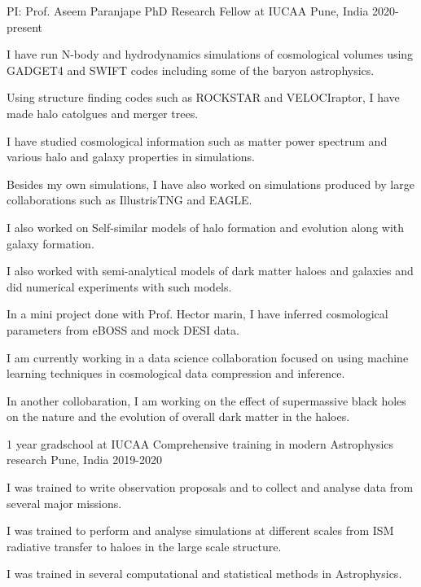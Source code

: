 \begin{cventries}

{
\cventry
{PI: Prof. Aseem Paranjape} %
{PhD Research Fellow at IUCAA} %
{Pune, India} %
{2020-present} %
{ %
\begin{cvitems}
\item {I have run N-body and hydrodynamics simulations of cosmological volumes using GADGET4 and SWIFT codes including some of the baryon astrophysics.}
\item {Using structure finding codes such as ROCKSTAR and VELOCIraptor, I have made halo catolgues and merger trees.}
\item {I have studied cosmological information such as matter power spectrum and various halo and galaxy properties in simulations.}
\item {Besides my own simulations, I have also worked on simulations produced by large collaborations such as IllustrisTNG and EAGLE.}
\item {I also worked on Self-similar models of halo formation and evolution along with galaxy formation.}
\item {I also worked with semi-analytical models of dark matter haloes and galaxies and did numerical experiments with such models.}
\item {In a mini project done with Prof. Hector marin, I have inferred cosmological parameters from eBOSS and mock DESI data.}
\item {I am currently working in a data science collaboration focused on using machine learning techniques in cosmological data compression and inference.}
\item {In another collobaration, I am working on the effect of supermassive black holes on the nature and the evolution of overall dark matter in the haloes.}
\end{cvitems}
}
}


{
\cventry
{1 year gradschool at IUCAA} %
{Comprehensive training in modern Astrophysics research} %
{Pune, India} %
{2019-2020} %
{ %
\begin{cvitems}
\item {I was trained to write observation proposals and to collect and analyse data from several major missions.}
\item {I was trained to perform and analyse simulations at different scales from ISM radiative transfer to haloes in the large scale structure.}
\item {I was trained in several computational and statistical methods in Astrophysics.}
\end{cvitems}
}
}




\end{cventries}
